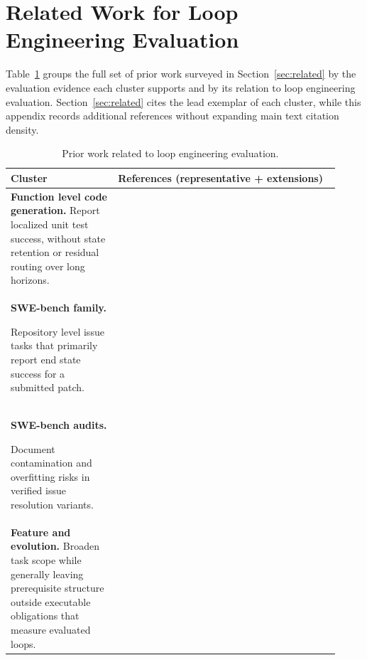 \section{Related Work for Loop Engineering Evaluation}\label{app:related-bench}

Table~\ref{tab:related-bench} groups the full set of prior work surveyed in Section~\ref{sec:related} by the evaluation evidence each cluster supports and by its relation to loop engineering evaluation. Section~\ref{sec:related} cites the lead exemplar of each cluster, while this appendix records additional references without expanding main text citation density.

\begin{table}[!ht]
  \centering
  \caption{Prior work related to loop engineering evaluation.}
  \label{tab:related-bench}
  \tiny
  \setlength{\tabcolsep}{2pt}
  \renewcommand{\arraystretch}{0.74}
  \begin{tabular}{@{}p{0.30\linewidth} p{0.62\linewidth}@{}}
    \toprule
    \textbf{Cluster} & \textbf{References (representative + extensions)} \\
    \midrule
    \textbf{Function level code generation.}
    Report localized unit test success, without state retention or residual routing over long horizons.
      & \citet{chen2021evaluating,hendrycks2021measuring,jain2024livecodebench,liu2023your} \\
    \midrule
    \textbf{SWE-bench family.}

    Repository level issue tasks that primarily report end state success for a submitted patch.
      & \citet{jimenez2023swe,swebench,zan2025multi,yang2024swe,liu2025swebenchm,swebench_pro,swebench_verified,swelancer,swegym,rebench,sonwane2026omnicode,sehgal2025formulacode,tan2024devbench} \\
    \midrule
    \textbf{SWE-bench audits.}

    Document contamination and overfitting risks in verified issue resolution variants.
      & \citet{sbv_contamination,zhu2025establishing} \\
    \midrule

    \textbf{Feature and evolution.}
    Broaden task scope while generally leaving prerequisite structure outside executable obligations that measure evaluated loops.
      & \citet{zhou2026featurebench,chen2025featbench,thai2025swe,gautam2025refactorbench,orlanski2026slopcodebench,longcli_bench,nl2repo_bench} \\
    \midrule


\end{tabular}
\end{table}
